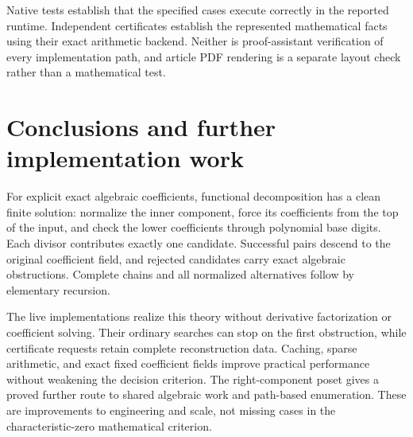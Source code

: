 \documentclass[11pt,a4paper]{article}
\numberwithin{equation}{section}
\theoremstyle{definition}
\theoremstyle{remark}
\begin{document}
Native tests establish that the specified cases execute correctly in the
reported runtime.  Independent certificates establish the represented
mathematical facts using their exact arithmetic backend.  Neither is
proof-assistant verification of every implementation path, and article PDF
rendering is a separate layout check rather than a mathematical test.

\section{Conclusions and further implementation work}
\label{sec:conclusion}
For explicit exact algebraic coefficients, functional decomposition has a
clean finite solution: normalize the inner component, force its coefficients
from the top of the input, and check the lower coefficients through polynomial
base digits. Each divisor contributes exactly one candidate. Successful
pairs descend to the original coefficient field, and rejected candidates
carry exact algebraic obstructions. Complete chains and all normalized
alternatives follow by elementary recursion.

The live implementations realize this theory without derivative factorization
or coefficient solving.  Their ordinary searches can stop on the first
obstruction, while certificate requests retain complete reconstruction data.
Caching, sparse arithmetic, and exact fixed coefficient fields improve
practical performance without weakening the decision criterion.
The right-component poset gives a proved further route to shared algebraic
work and path-based enumeration.  These are improvements to engineering
and scale, not missing cases in the characteristic-zero mathematical criterion.
\end{document}
